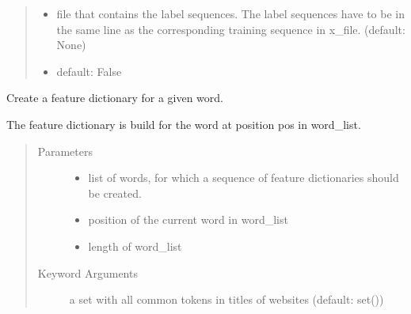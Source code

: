 \documentclass[letterpaper,10pt,english]{sphinxmanual}
\begin{document}
\begin{fulllineitems}
\begin{fulllineitems}
\begin{quote}
\begin{description}
\begin{itemize}
\item {} 
 \textendash{} file that contains the label sequences. The label
sequences have to be in the same line as the corresponding
training sequence in x\_file. (default: None)

\item {} 
 \textendash{} default: False

\end{itemize}

\end{description}\end{quote}

\end{fulllineitems}


\begin{fulllineitems}
\label{\detokenize{api:product_crf.ProductnameCRF.create_features}}
Create a feature dictionary for a given word.

The feature dictionary is build for the word at position pos
in word\_list.
\begin{quote}\begin{description}
\item[{Parameters}] \leavevmode\begin{itemize}
\item {} 
 \textendash{} list of words, for which a sequence of feature
dictionaries should be created.

\item {} 
 \textendash{} position of the current word in word\_list

\item {} 
 \textendash{} length of word\_list

\end{itemize}

\item[{Keyword Arguments}] \leavevmode
{} \textendash{} a set with all common tokens in titles of websites
(default: set())

\end{description}\end{quote}

\end{fulllineitems}


\end{fulllineitems}
\end{document}
